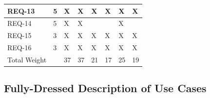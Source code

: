 \documentclass[letterpaper,english, 12pt]{scrreprt}
\begin{document}
\begin{center}
\begin{tabular}{|C{1cm}|C{1cm}|C{1cm}|C{1cm}|C{1cm}|C{1cm}|C{1cm}|C{1cm}|}
                \hline
                        REQ-13 & 5 & X & X & X & X & X & X  \\
                \hline
                        REQ-14 & 5 & X & X & & & X &   \\
                \hline
                        REQ-15 & 3 & X & X & X & X & X & X  \\
                \hline
                        REQ-16 & 3 & X & X & X & X & X & X  \\
                \hline
                        Total Weight & & 37 & 37 & 21 & 17 & 25 & 19  \\
                \hline
        \end{tabular}
\end{center}


\subsection{Fully-Dressed Description of Use Cases}
\end{document}
